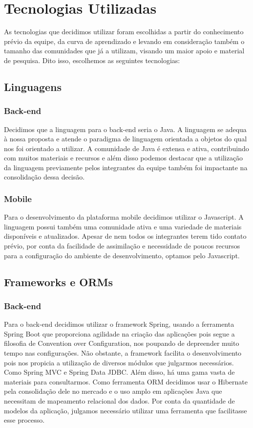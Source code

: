 \chapter{Tecnologias Utilizadas}

As tecnologias que decidimos utilizar foram escolhidas a partir do conhecimento prévio da equipe, da curva de aprendizado e levando em consideração também o tamanho das comunidades que já a utilizam, visando um maior apoio e material de pesquisa.
Dito isso, escolhemos as seguintes tecnologias:

\section{Linguagens}

\subsection{Back-end}

Decidimos que a linguagem para o back-end seria o Java. A linguagem se adequa à nossa proposta e atende o paradigma de linguagem orientada a objetos do qual nos foi orientado a utilizar. 
A comunidade de Java é extensa e ativa, contribuindo com muitos materiais e recursos e além disso podemos destacar que a utilização da linguagem previamente pelos integrantes da equipe também foi impactante na consolidação dessa decisão.

\subsection{Mobile}
Para o desenvolvimento da plataforma mobile decidimos utilizar o Javascript. A linguagem possui também uma comunidade ativa e uma variedade de materiais disponíveis e atualizados. Apesar de nem todos os integrantes terem tido contato prévio, por conta da facilidade de assimilação e necessidade de poucos recursos para a configuração do ambiente de desenvolvimento, optamos pelo Javascript.

\section{Frameworks e ORMs}

\subsection{Back-end}

Para o back-end decidimos utilizar o framework Spring, usando a ferramenta Spring Boot que proporciona agilidade na criação das aplicações pois segue a filosofia de Convention over Configuration\cite{Devopedia2020}, nos poupando de depreender muito tempo nas configurações. Não obstante, a framework facilita o desenvolvimento pois nos propicia a utilização de diversos módulos que julgarmos necessários. Como Spring MVC e Spring Data JDBC. Além disso, há uma gama vasta de materiais para consultarmos.
Como ferramenta ORM decidimos usar o Hibernate pela consolidação dele no mercado e o uso amplo em aplicações Java que necessitam de mapeamento relacional dos dados. Por conta da quantidade de modelos da aplicação, julgamos necessário utilizar uma ferramenta que facilitasse esse processo. 

